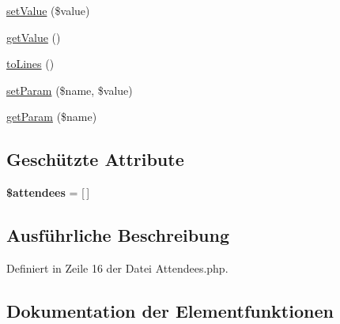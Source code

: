 \begin{DoxyCompactItemize}
\item 
\mbox{\hyperlink{class_eluceo_1_1i_cal_1_1_property_1_1_event_1_1_attendees_a9e8601c18fb1556c268b2c5ee355a373}{set\+Value}} (\$value)
\item 
\mbox{\hyperlink{class_eluceo_1_1i_cal_1_1_property_1_1_event_1_1_attendees_a17eed43b29bbf46dd988352929ff989b}{get\+Value}} ()
\item 
\mbox{\hyperlink{class_eluceo_1_1i_cal_1_1_property_1_1_event_1_1_attendees_a7edb50bd87ab091d6ed6d296634e85e5}{to\+Lines}} ()
\item 
\mbox{\hyperlink{class_eluceo_1_1i_cal_1_1_property_1_1_event_1_1_attendees_a9887bbe557ea9aa53f7f3bf1fb809928}{set\+Param}} (\$name, \$value)
\item 
\mbox{\hyperlink{class_eluceo_1_1i_cal_1_1_property_1_1_event_1_1_attendees_a181c7789d94b49f055714a380472200b}{get\+Param}} (\$name)
\end{DoxyCompactItemize}
\subsection*{Geschützte Attribute}
\begin{DoxyCompactItemize}
\item 
\mbox{\label{class_eluceo_1_1i_cal_1_1_property_1_1_event_1_1_attendees_a375f1e12822b9d2402c6b1f74fa012fc}} 
{\bfseries \$attendees} = \mbox{[}$\,$\mbox{]}
\end{DoxyCompactItemize}


\subsection{Ausführliche Beschreibung}


Definiert in Zeile 16 der Datei Attendees.\+php.



\subsection{Dokumentation der Elementfunktionen}
\mbox{\label{class_eluceo_1_1i_cal_1_1_property_1_1_event_1_1_attendees_a76607267c05bd6dc2b735b50bdd5a229}} 
